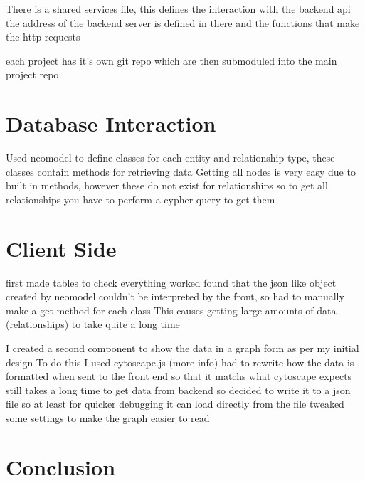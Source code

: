 There is a shared services file, this defines the interaction with the backend api
the address of the backend server is defined in there and the functions that make the http requests

each project has it's own git repo which are then submoduled into the main project repo
\section{Database Interaction}
Used neomodel to define classes for each entity and relationship type, these classes contain methods for retrieving data
Getting all nodes is very easy due to built in methods, however these do not exist for relationships
so to get all relationships you have to perform a cypher query to get them
\section{Client Side}
first made tables to check everything worked
found that the json like object created by neomodel couldn't be interpreted by the front, so had to manually make a get method for each class
This causes getting large amounts of data (relationships) to take quite a long time

I created a second component to show the data in a graph form as per my initial design
To do this I used cytoscape.js (more info)
had to rewrite how the data is formatted when sent to the front end so that it matchs what cytoscape expects
still takes a long time to get data from backend 
so decided to write it to a json file so at least for quicker debugging it can load directly from the file
tweaked some settings to make the graph easier to read

\section{Conclusion}